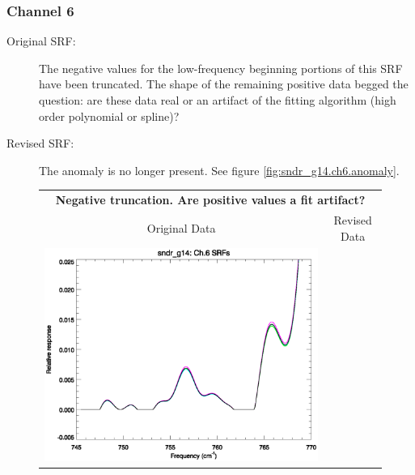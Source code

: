 \subsubsection{Channel 6}
\begin{description}
  \item[Original SRF:] The negative values for the low-frequency beginning portions of this SRF have been truncated. The shape of the remaining positive data begged the question: are these data real or an artifact of the fitting algorithm (high order polynomial or spline)?
  \item[Revised SRF:]  The anomaly is no longer present. See figure \ref{fig:sndr_g14.ch6.anomaly}.
\end{description}

\begin{figure}[htp]
  \centering
  \begin{tabular}{c c}
    \multicolumn{2}{c}{\textsf{\bfseries Negative truncation. Are positive values a fit artifact?}} \\
    \hspace{2.0em}\textsf{Original Data} &
    \hspace{2.0em}\textsf{Revised Data} \\
    \includegraphics[scale=0.5,trim=0 40 0 0]{graphics/zoom_anomaly/original/sndr_g14.ch6.srf.eps} &

\end{tabular}
\end{figure}
